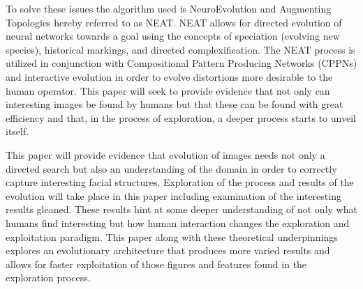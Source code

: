 To solve these issues the algorithm used is NeuroEvolution and Augmenting Topologies \cite{stanley2002evolving} hereby referred to as NEAT.
NEAT allows for directed evolution of neural networks towards a goal using the concepts of speciation (evolving new species), historical markings,
and directed complexification. The NEAT process is utilized in conjunction with Compositional Pattern Producing Networks \cite{stanley2007compositional}
(CPPNs) and interactive evolution in order to evolve distortions more desirable to the human operator. This paper will seek to provide evidence that not
only can interesting images be found by humans but that these can be found with great efficiency and that, in the process of exploration, a
deeper process starts to unveil itself.

This paper will provide evidence that evolution of images needs not only a directed search but also an understanding of the domain
in order to correctly capture interesting facial structures. Exploration of the process and results of the evolution will take place
in this paper including examination of the interesting results gleaned. These results hint at some deeper understanding of not only what
humans find interesting but how human interaction changes the exploration and exploitation paradigm. This paper along with these
theoretical underpinnings explores an evolutionary architecture that produces more varied results and allows for faster exploitation
of those figures and features found in the exploration process.